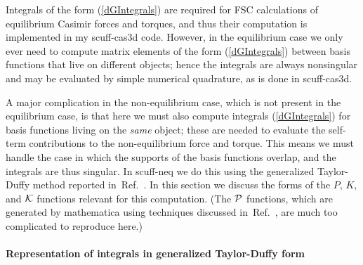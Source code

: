 \documentclass[letterpaper]{article}
\newcommand{\citeasnoun}[1]{Ref.~\citenum{#1}}
\begin{document}
Integrals of the form (\ref{dGIntegrals}) are required for 
FSC calculations of equilibrium Casimir forces and torques,
and thus their computation is implemented in my {\sc scuff-cas3d} code.
However, in the equilibrium case we only ever need to compute
matrix elements of the form (\ref{dGIntegrals}) between basis
functions that live on different objects; hence the integrals
are always nonsingular and may be evaluated by simple 
numerical quadrature, as is done in {\sc scuff-cas3d}.

A major complication in the non-equilibrium case, which is
not present in the equilibrium case, is that here we must
also compute integrals (\ref{dGIntegrals}) for basis
functions living on the \textit{same} object; these are needed 
to evaluate the self-term contributions to the non-equilibrium
force and torque. This means we must handle the case in
which the supports of the basis functions overlap, and the
integrals are thus singular. In {\sc scuff-neq} we do this
using the generalized Taylor-Duffy method reported 
in~\citeasnoun{Reid2013C}. In this section we discuss the 
forms of the $P$, $K$, and $\mathcal{K}$ functions relevant for
this computation. (The $\mathcal{P}$ functions, which are generated
by {\sc mathematica} using techniques discussed in~\citeasnoun{Reid2013C},
are much too complicated to reproduce here.)

\paragraph{Representation of integrals in generalized Taylor-Duffy form}
\end{document}
